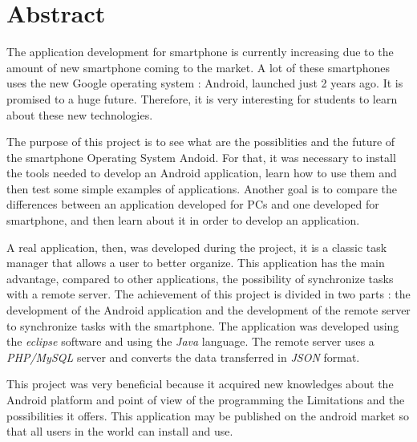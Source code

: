\chapter*{Abstract}

\vspace{2cm}

\noindent The application development for smartphone is currently increasing due to the amount of new smartphone coming to the market. A lot of these smartphones uses the new Google operating system : Android, launched just 2 years ago. It is promised to a huge future. Therefore, it is very interesting for students to learn about these new technologies.

\noindent The purpose of this project is to see what are the possiblities and the future of the smartphone Operating System Andoid. For that, it was necessary to install the tools needed to develop an Android application, learn how to use them and then test some simple examples of applications. Another goal is to compare the differences between an application developed for PCs and one developed for smartphone, and then learn about it in order to develop an application.

\noindent A real application, then, was developed during the project, it is a classic task manager that allows a user to better organize. This application has the main advantage, compared to other applications, the possibility of synchronize tasks with a remote server. The achievement of this project is divided in two parts : the development of the Android application and the development of the remote server to synchronize tasks with the smartphone. The application was developed using the \textit{eclipse} software and using the \textit{Java} language. The remote server uses a \textit{PHP/MySQL} server and converts the data transferred in \textit{JSON} format.

\noindent This project was very beneficial because it acquired new knowledges about the Android platform and point of view of the programming the Limitations and the possibilities it offers. This application may be published on the android market so that all users in the world can install and use.

\clearpage
\newpage